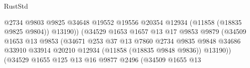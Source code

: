 \begin{lexlean}{RustStd}
\begin{coremodule}
                                                  @2734
                                                  @9803
                                                  @9825
                                                  @34648
                                                  @19552
                                                  @19556
                                                  @20354
                                                  @12934
                                                  (@11858 (@18835 @9825 @9804))
                                                  @13190))
                                              (@34529
                                                @1653
                                                @1657
                                                @13
                                                @17
                                                @9853
                                                @9879
                                                (@34509
                                                  @1653
                                                  @13
                                                  @9853
                                                  (@34671
                                                    @253
                                                    @37
                                                    @13
                                                    @7860
                                                    @2734
                                                    @9835
                                                    @9848
                                                    @34686
                                                    @33910
                                                    @33914
                                                    @20210
                                                    @12934
                                                    (@11858 (@18835 @9848 @9836))
                                                    @13190))
                                                (@34529
                                                  @1655
                                                  @125
                                                  @13
                                                  @16
                                                  @9877
                                                  @2496
                                                  (@34509
                                                    @1655
                                                    @13

\end{coremodule}
\end{lexlean}
